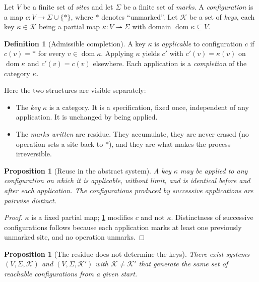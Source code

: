 \documentclass[11pt,twocolumn,a4paper]{article}
\theoremstyle{plain}
\newtheorem{proposition}[theorem]{Proposition}
\theoremstyle{definition}
\newtheorem{definition}[theorem]{Definition}
\theoremstyle{remark}
\begin{document}
Let $V$ be a finite set of \emph{sites} and let $\Sigma$ be a finite set of
\emph{marks}. A \emph{configuration} is a map $c : V \to \Sigma \cup \{\ast\}$,
where $\ast$ denotes ``unmarked''. Let $\mathcal{K}$ be a set of
\emph{keys}, each key $\kappa \in \mathcal{K}$ being a partial map
$\kappa : V \rightharpoonup \Sigma$ with domain $\operatorname{dom}\kappa
\subseteq V$.

\begin{definition}[Admissible completion]
\label{def:admissible}
A key $\kappa$ is \emph{applicable} to configuration $c$ if
$c(v) = \ast$ for every $v \in \operatorname{dom}\kappa$. Applying $\kappa$
yields $c'$ with $c'(v) = \kappa(v)$ on $\operatorname{dom}\kappa$ and
$c'(v) = c(v)$ elsewhere. Each application is a \emph{completion} of the
category $\kappa$.
\end{definition}

Here the two structures are visible separately:

\begin{itemize}[leftmargin=2em]
\item The \emph{key} $\kappa$ is a category. It is a specification, fixed once,
independent of any application. It is unchanged by being applied.
\item The \emph{marks written} are residue. They accumulate, they are never
erased (no operation sets a site back to $\ast$), and they are what makes the
process irreversible.
\end{itemize}

\begin{proposition}[Reuse in the abstract system]
\label{prop:abstract-reuse}
A key $\kappa$ may be applied to any configuration on which it is applicable,
without limit, and is identical before and after each application. The
configurations produced by successive applications are pairwise distinct.
\end{proposition}

\begin{proof}
$\kappa$ is a fixed partial map; \cref{def:admissible} modifies $c$ and not
$\kappa$. Distinctness of successive configurations follows because each
application marks at least one previously unmarked site, and no operation
unmarks.
\end{proof}

\begin{proposition}[The residue does not determine the keys]
\label{prop:abstract-independence}
There exist systems $(V,\Sigma,\mathcal{K})$ and $(V,\Sigma,\mathcal{K}')$ with
$\mathcal{K} \neq \mathcal{K}'$ that generate the same set of reachable
configurations from a given start.
\end{proposition}
\end{document}
